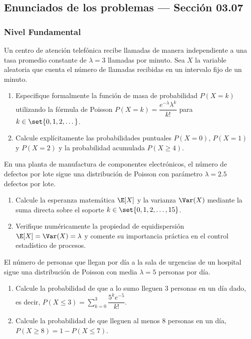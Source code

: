 \subsection*{Enunciados de los problemas --- Sección 03.07}

\subsubsection*{Nivel Fundamental}

\begin{problema}
	\label{prob:3.7.1}
	Un centro de atención telefónica recibe llamadas de manera independiente a una tasa promedio constante de $\lambda = 3$ llamadas por minuto. Sea $X$ la variable aleatoria que cuenta el número de llamadas recibidas en un intervalo fijo de un minuto.
	\begin{enumerate}
		\item Especifique formalmente la función de masa de probabilidad $P(X = k)$ utilizando la fórmula de Poisson $P(X = k) = \dfrac{e^{-\lambda}\lambda^{k}}{k!}$ para $k \in \set{0, 1, 2, \dots}$.
		\item Calcule explícitamente las probabilidades puntuales $P(X = 0)$, $P(X = 1)$ y $P(X = 2)$ y la probabilidad acumulada $P(X \ge 4)$.
	\end{enumerate}
\end{problema}

\begin{problema}
	\label{prob:3.7.2}
	En una planta de manufactura de componentes electrónicos, el número de defectos por lote sigue una distribución de Poisson con parámetro $\lambda = 2.5$ defectos por lote.
	\begin{enumerate}
		\item Calcule la esperanza matemática $\E[X]$ y la varianza $\Var(X)$ mediante la suma directa sobre el soporte $k \in \set{0, 1, 2, \dots, 15}$.
		\item Verifique numéricamente la propiedad de equidispersión $\E[X] = \Var(X) = \lambda$ y comente su importancia práctica en el control estadístico de procesos.
	\end{enumerate}
\end{problema}

\begin{problema}
	\label{prob:3.7.3}
	El número de personas que llegan por día a la sala de urgencias de un hospital sigue una distribución de Poisson con media $\lambda = 5$ personas por día.
	\begin{enumerate}
		\item Calcule la probabilidad de que a lo sumo lleguen $3$ personas en un día dado, es decir, $P(X \le 3) = \sum_{k=0}^{3} \dfrac{5^{k} e^{-5}}{k!}$.
		\item Calcule la probabilidad de que lleguen al menos $8$ personas en un día, $P(X \ge 8) = 1 - P(X \le 7)$.
	\end{enumerate}
\end{problema}

